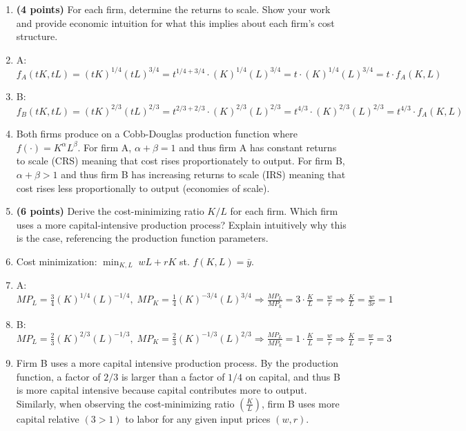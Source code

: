 \documentclass[11pt]{article}
\begin{document}
\begin{enumerate}[label=(\alph*)]
    \item \textbf{(4 points)} For each firm, determine the returns to scale. Show your work and provide economic intuition for what this implies about each firm’s cost structure.
    \item[] A: $f_A(tK,tL)=(tK)^{1/4}(tL)^{3/4}=t^{1/4+3/4}\cdot(K)^{1/4}(L)^{3/4}=t\cdot(K)^{1/4}(L)^{3/4}=t\cdot f_A(K,L)$
    \item[] B: $f_B(tK,tL)=(tK)^{2/3}(tL)^{2/3}=t^{2/3+2/3}\cdot(K)^{2/3}(L)^{2/3}=t^{4/3}\cdot(K)^{2/3}(L)^{2/3}=t^{4/3}\cdot f_A(K,L)$
    \item[] Both firms produce on a Cobb-Douglas production function where $f(\cdot)=K^\alpha L^\beta$. For firm A, $\alpha+\beta=1$ and thus firm A has constant returns to scale (CRS) meaning that cost rises proportionately to output. For firm B, $\alpha+\beta>1$ and thus firm B has increasing returns to scale (IRS) meaning that cost rises less proportionally to output (economies of scale).

    \item \textbf{(6 points)} Derive the cost-minimizing ratio $K/L$ for each firm. Which firm uses a more capital-intensive production process? Explain intuitively why this is the case, referencing the production function parameters.
    \item[] Cost minimization: $\min_{K,L}\; wL+rK$ st. $f(K,L)=\bar{y}$.
    \item[] A: $MP_L=\frac{3}{4}(K)^{1/4}(L)^{-1/4},\; MP_K=\frac{1}{4}(K)^{-3/4}(L)^{3/4}\Rightarrow\frac{MP_L}{MP_k}=3\cdot\frac{K}{L}=\frac{w}{r}\Rightarrow\frac{K}{L}=\frac{w}{3r}=1$
    \item[] B: $MP_L=\frac{2}{3}(K)^{2/3}(L)^{-1/3},\; MP_K=\frac{2}{3}(K)^{-1/3}(L)^{2/3}\Rightarrow\frac{MP_L}{MP_k}=1\cdot\frac{K}{L}=\frac{w}{r}\Rightarrow\frac{K}{L}=\frac{w}{r}=3$
    \item[] Firm B uses a more capital intensive production process. By the production function, a factor of $2/3$ is larger than a factor of $1/4$ on capital, and thus B is more capital intensive because capital contributes more to output. Similarly, when observing the cost-minimizing ratio $(\frac{K}{L})$, firm B uses more capital relative $(3>1)$ to labor for any given input prices $(w,r)$.


\end{enumerate}
\end{document}
